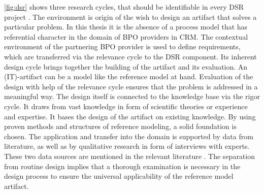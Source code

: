 \Fig \ref{fig:dsr} shows three research cycles, that should be identifiable in every \acrshort{DSR} project \citep{Hevner2010}. The environment is origin of the wish to design an artifact that solves a particular problem. In this thesis it is the absence of a process model that has referential character in the domain of \acrshort{BPO} providers in \acrshort{CRM}. The contextual environment of the partnering  \acrshort{BPO} provider is used to define requirements, which are transferred via the relevance cycle to the \acrshort{DSR} component. Its inherent design cycle brings together the building of the artifact and its evaluation. An (IT)-artifact can be a model \citep{Hevner2010} like the reference model at hand. Evaluation of the design with help of the relevance cycle ensures that the problem is addressed in a meaningful way. The design itself is connected to the knowledge base via the rigor cycle. It draws from vast knowledge in form of scientific theories or experience and expertise. It bases the design of the artifact on existing knowledge. By using proven methods and structures of reference modeling, a solid foundation is chosen. The application and transfer into the domain is supported by data from literature, as well as by qualitative research in form of interviews with experts. These two data sources are mentioned in the relevant literature \citep[]{thomas2006mang}. The separation from routine design implies that a thorough examination is necessary in the design process to ensure the universal applicability of the reference model artifact. 



